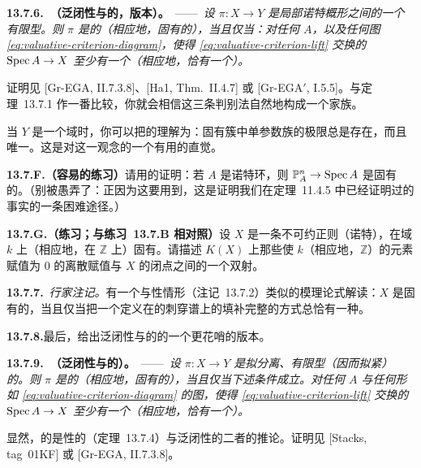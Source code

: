 \textbf{13.7.6.\ \trhTheorem{}（泛闭性与\trProperness{}的\trValuativeCriteria，\trDVR{}版本）。}\ ——\ \emph{设 $\pi\colon X\to Y$ 是局部诺特概形之间的一个有限型\trMorphism。则 $\pi$ 是\trUniversallyClosed{}的（相应地，固有的），当且仅当：对任何\trDVR{} $A$，以及任何图 \eqref{eq:valuative-criterion-diagram}，使得 \eqref{eq:valuative-criterion-lift} 交换的\trMorphism{} $\operatorname{Spec} A\to X$ 至少有一个（相应地，恰有一个）。}

证明见 [Gr-EGA, II.7.3.8]、[Ha1, Thm.~II.4.7] 或 [Gr-EGA$'$, I.5.5]。与定理~13.7.1 作一番比较，你就会相信这三条判别法自然地构成一个家族。

当 $Y$ 是一个域时，你可以把\trProperness{}的\trValuativeCriteria{}理解为：固有簇中单参数族的极限总是存在，而且唯一。这是对\trProperness{}这一观念的一个有用的直觉。

\textbf{13.7.F.（容易的练习）}\quad 请用\trProperness{}的\trValuativeCriteria{}证明：若 $A$ 是诺特环，则 $\mathbb{P}^n_A\to\operatorname{Spec} A$ 是固有的。（别被愚弄了：正因为这要用到\trValuativeCriteria，这是证明我们在定理~11.4.5 中已经证明过的事实的一条困难途径。）

\textbf{13.7.G.（练习；与\mbox{练习~13.7.B} 相对照）}\quad 设 $X$ 是一条不可约正则（诺特）\trCurve，在域 $k$ 上（相应地，在 $\mathbb{Z}$ 上）固有。请描述 $K(X)$ 上那些使 $k$（相应地，$\mathbb{Z}$）的元素赋值为 $0$ 的离散赋值与 $X$ 的闭点之间的一个双射。

\textbf{13.7.7.}\ \emph{行家注记。}\quad 有一个与\trSeparated{}性情形（注记~13.7.2）类似的模理论式解读：$X$ 是固有的，当且仅当把一个定义在\trDVR{}的刺穿谱上的\trFamily{}填补完整的方式总恰有一种。

\textbf{13.7.8.}\quad 最后，给出泛闭性与\trProperness{}的\trValuativeCriteria{}的一个更花哨的版本。

\textbf{13.7.9.\ \trhTheorem{}（泛闭性与\trProperness{}的\trValuativeCriteria）。}\ ——\ \emph{设 $\pi\colon X\to Y$ 是拟分离、有限型（因而拟紧）的\trMorphism。则 $\pi$ 是\trUniversallyClosed{}的（相应地，固有的），当且仅当下述条件成立。对任何\trValuationRing{} $A$ 与任何形如 \eqref{eq:valuative-criterion-diagram} 的图，使得 \eqref{eq:valuative-criterion-lift} 交换的\trMorphism{} $\operatorname{Spec} A\to X$ 至少有一个（相应地，恰有一个）。}

显然，\trProperness{}的\trValuativeCriteria{}是\trSeparated{}性的\trValuativeCriteria{}（定理~13.7.4）与泛闭性的\trValuativeCriteria{}二者的推论。证明见 [Stacks, tag~01KF] 或 [Gr-EGA, II.7.3.8]。

